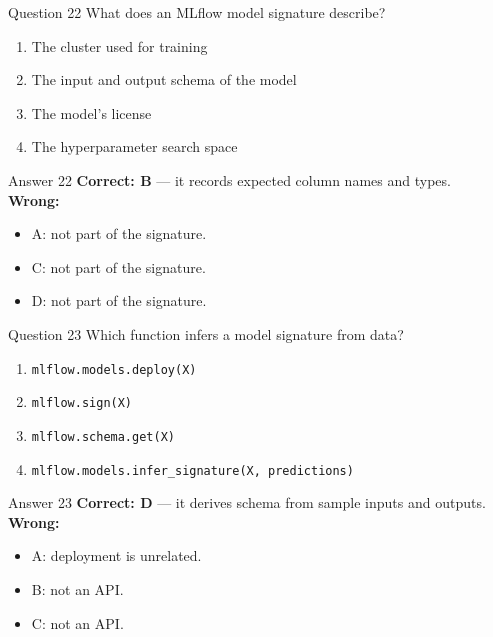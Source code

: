 \documentclass[aspectratio=169,11pt]{beamer}
\begin{document}
	\begin{frame}{Question 22}
		What does an MLflow model signature describe?
		\begin{enumerate}[label=\Alph*.]
			\item The cluster used for training
			\item The input and output schema of the model
			\item The model's license
			\item The hyperparameter search space
		\end{enumerate}
	\end{frame}
	\begin{frame}{Answer 22}
		\textbf{Correct: B} --- it records expected column names and types.\\
		\vspace{0.5em}
		\textbf{Wrong:}
		\begin{itemize}
			\item A: not part of the signature.
			\item C: not part of the signature.
			\item D: not part of the signature.
		\end{itemize}
	\end{frame}
	
	\begin{frame}{Question 23}
		Which function infers a model signature from data?
		\begin{enumerate}[label=\Alph*.]
			\item \texttt{mlflow.models.deploy(X)}
			\item \texttt{mlflow.sign(X)}
			\item \texttt{mlflow.schema.get(X)}
			\item \texttt{mlflow.models.infer\_signature(X, predictions)}
		\end{enumerate}
	\end{frame}
	\begin{frame}{Answer 23}
		\textbf{Correct: D} --- it derives schema from sample inputs and outputs.\\
		\vspace{0.5em}
		\textbf{Wrong:}
		\begin{itemize}
			\item A: deployment is unrelated.
			\item B: not an API.
			\item C: not an API.
		\end{itemize}
	\end{frame}
	
\end{document}
